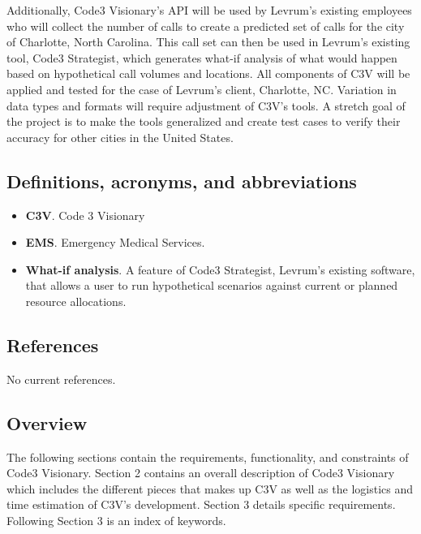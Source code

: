 \documentclass[onecolumn, draftclsnofoot,10pt, compsoc]{IEEEtran}
\begin{document}
    Additionally, Code3 Visionary's API will be used by Levrum's existing employees who will collect the number of calls to create a predicted set of calls for the city of Charlotte, North Carolina.
    This call set can then be used in Levrum's existing tool, Code3 Strategist, which generates what-if analysis of what would happen based on hypothetical call volumes and locations. 
    All components of C3V will be applied and tested for the case of Levrum's client, Charlotte, NC.
    Variation in data types and formats will require adjustment of C3V's tools.
    A stretch goal of the project is to make the tools generalized and create test cases to verify their accuracy for other cities in the United States.
    
    \subsection{Definitions, acronyms, and abbreviations}
        \begin{itemize}
            \item\textbf{C3V}. Code 3 Visionary
            \item\textbf{EMS}. Emergency Medical Services.
            \item\textbf{What-if analysis}. A feature of Code3 Strategist, Levrum's existing software, that allows a user to run hypothetical scenarios against current or planned resource allocations.  
        \end{itemize}
    \subsection{References}
    No current references.
    \subsection{Overview}
    The following sections contain the requirements, functionality, and constraints of Code3 Visionary. Section 2 contains an overall description of Code3 Visionary which includes the different pieces that makes up C3V as well as the logistics and time estimation of C3V's development. Section 3 details specific requirements. Following Section 3 is an index of keywords.
\end{document}
